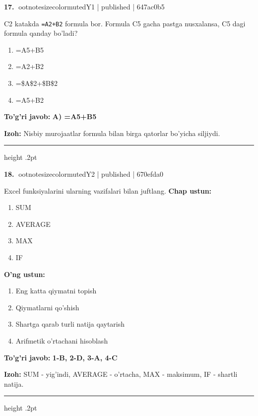\documentclass[10pt,a4paper]{article}
\begin{document}
\textbf{\color{ink}17.} {ootnotesizecolor{muted}Y1 | published | 647ac0b5}
\par
C2 katakda \texttt{=A2+B2} formula bor. Formula C5 gacha pastga nusxalansa, C5 dagi formula qanday bo'ladi?
\begin{enumerate}[label=\Alph*),leftmargin=9mm]
\item =A5+B5
\item =A2+B2
\item =\$A\$2+\$B\$2
\item =A5+B2
\end{enumerate}
\begin{tcolorbox}[enhanced,breakable,colback=teal!4,colframe=teal!55!black,boxrule=0.45pt,arc=1.2mm,left=2.8mm,right=2.8mm,top=2mm,bottom=2mm]
\textbf{\color{teal}To'g'ri javob:} \textbf{A) =A5+B5}
\par\smallskip
\textbf{Izoh:} Nisbiy murojaatlar formula bilan birga qatorlar bo'yicha siljiydi.
\end{tcolorbox}
\vspace{2mm}\hrule height .2pt\vspace{2mm}

\textbf{\color{ink}18.} {ootnotesizecolor{muted}Y2 | published | 670efda0}
\par
Excel funksiyalarini ularning vazifalari bilan juftlang.
\textbf{Chap ustun:}\begin{enumerate}[label=\arabic*),leftmargin=9mm]
\item SUM
\item AVERAGE
\item MAX
\item IF
\end{enumerate}
\textbf{O'ng ustun:}\begin{enumerate}[label=\Alph*),leftmargin=9mm]
\item Eng katta qiymatni topish
\item Qiymatlarni qo'shish
\item Shartga qarab turli natija qaytarish
\item Arifmetik o'rtachani hisoblash
\end{enumerate}
\begin{tcolorbox}[enhanced,breakable,colback=teal!4,colframe=teal!55!black,boxrule=0.45pt,arc=1.2mm,left=2.8mm,right=2.8mm,top=2mm,bottom=2mm]
\textbf{\color{teal}To'g'ri javob:} \textbf{1-B, 2-D, 3-A, 4-C}
\par\smallskip
\textbf{Izoh:} SUM - yig'indi, AVERAGE - o'rtacha, MAX - maksimum, IF - shartli natija.
\end{tcolorbox}
\vspace{2mm}\hrule height .2pt\vspace{2mm}
\end{document}
